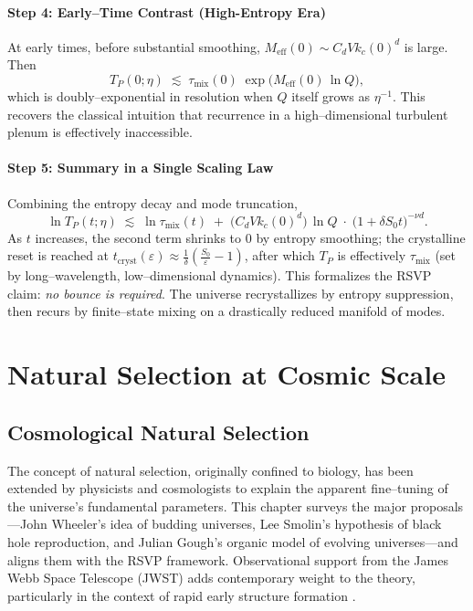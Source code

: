 \documentclass[a4paper,11pt,openany]{book}
\begin{document}
\subsection{Step 4: Early–Time Contrast (High-Entropy Era)}

At early times, before substantial smoothing, $M_{\text{eff}}(0)\sim C_d V k_c(0)^d$ is large.
Then
\[
T_P(0;\eta) \;\lesssim\; \tau_{\text{mix}}(0)\;
\exp\!\Big(M_{\text{eff}}(0)\,\ln Q\Big),
\]
which is doubly–exponential in resolution when $Q$ itself grows as $\eta^{-1}$. This recovers the
classical intuition that recurrence in a high–dimensional turbulent plenum is effectively
inaccessible.

\subsection{Step 5: Summary in a Single Scaling Law}

Combining the entropy decay and mode truncation,
\[
\boxed{\;
\ln T_P(t;\eta) \;\lesssim\; \ln \tau_{\text{mix}}(t) \;+\; 
\big(C_d V k_c(0)^d\big)\,\ln Q\;\cdot\;\big(1+\delta S_0 t\big)^{-\nu d}.
\;}
\]
As $t$ increases, the second term shrinks to $0$ by entropy smoothing; the crystalline reset is
reached at $t_{\text{cryst}}(\varepsilon)\approx \frac{1}{\delta}(\frac{S_0}{\varepsilon}-1)$, after
which $T_P$ is effectively $\tau_{\text{mix}}$ (set by long–wavelength, low–dimensional dynamics).
This formalizes the RSVP claim: \emph{no bounce is required}. The universe recrystallizes by
entropy suppression, then recurs by finite–state mixing on a drastically reduced manifold of
modes.

\part{Natural Selection at Cosmic Scale}

\chapter{Cosmological Natural Selection}

The concept of natural selection, originally confined to biology, has been extended by 
physicists and cosmologists to explain the apparent fine–tuning of the universe’s 
fundamental parameters. This chapter surveys the major proposals—John Wheeler’s idea of 
budding universes, Lee Smolin’s hypothesis of black hole reproduction, and Julian Gough’s 
organic model of evolving universes—and aligns them with the RSVP framework. Observational 
support from the James Webb Space Telescope (JWST) adds contemporary weight to the theory, 
particularly in the context of rapid early structure formation 
\citep{wheeler1977genesis, smolin1997cosmos, gough2024egg, jwst2023early}.
\end{document}
